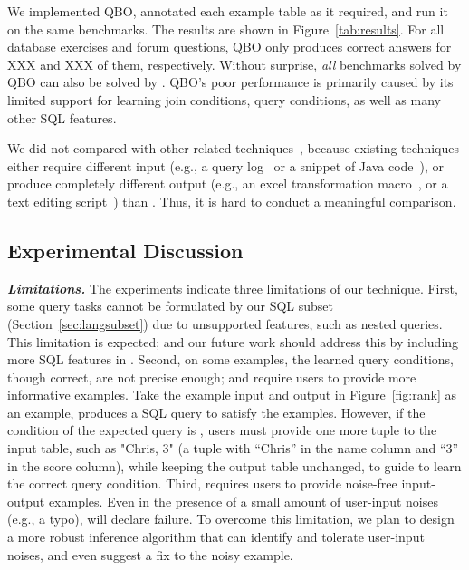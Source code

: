 We implemented QBO, annotated
each example table as it required, and run it
on the same benchmarks. The results are shown in Figure~\ref{tab:results}.
For all \exnum database exercises
and \pnum forum questions, QBO only produces correct answers
for XXX and XXX of them, respectively.
Without surprise, \textit{all}
benchmarks solved by QBO can also be solved by \ourtool.
QBO's poor performance is primarily caused by its
limited support for learning join conditions,
query conditions, as well as many other SQL features.

We did not compared \ourtool with other related techniques~\cite{Howe:2011,
abs-1208-2013, Harris:2011, Kandel:2011}, because
existing techniques either require different input
(e.g., a query log~\cite{Khoussainova:2010, Howe:2011}
or a snippet of Java code~\cite{abs-1208-2013}), 
or produce completely different
output (e.g., an excel transformation macro~\cite{Harris:2011}, or a
text editing script~\cite{Kandel:2011}) than \ourtool.
Thus, it is hard to conduct a meaningful comparison.

\subsection{Experimental Discussion}

\noindent \textbf{\textit{Limitations.}}
The experiments indicate three limitations
of our technique. First, some query tasks
cannot be formulated by our SQL subset (Section~\ref{sec:langsubset})
due to unsupported features, such as
nested queries. This limitation is expected;
and our future work
should address this by including more SQL
features in \ourtool.
Second, on some examples, the learned query
conditions, though correct, are not precise
enough; and require users to provide more informative examples.
Take the example input and output in Figure~\ref{fig:rank}
as an example, \ourtool produces a SQL
query 
to satisfy the examples. However, if
the condition of the expected query
is , users must provide
one more tuple to the input table, such as "Chris, 3"
(a tuple with ``Chris'' in the name column and ``3''
in the score column), while keeping the output table
unchanged, 
to guide \ourtool to learn the correct query condition.
Third, \ourtool requires
users to provide noise-free input-output examples.
Even in the presence of a small amount of user-input
noises (e.g., a typo), \ourtool will declare failure.
To overcome this limitation, we plan to design a more
robust inference algorithm that can identify
and tolerate user-input noises, and even suggest a fix
to the noisy example.

